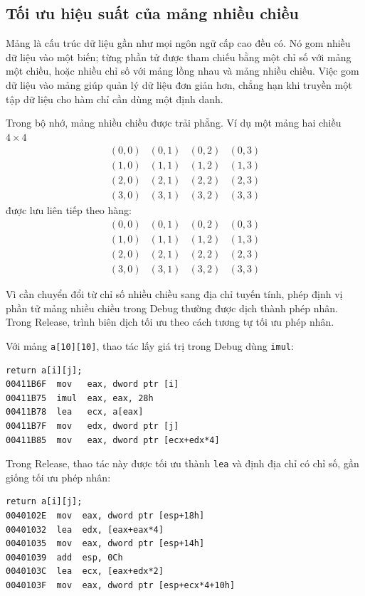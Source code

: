 \documentclass[11pt]{article}
\begin{document}
\subsection{Tối ưu hiệu suất của mảng nhiều chiều}

Mảng là cấu trúc dữ liệu gần như mọi ngôn ngữ cấp cao đều có. Nó gom nhiều dữ
liệu vào một biến; từng phần tử được tham chiếu bằng một chỉ số với mảng một
chiều, hoặc nhiều chỉ số với mảng lồng nhau và mảng nhiều chiều. Việc gom dữ
liệu vào mảng giúp quản lý dữ liệu đơn giản hơn, chẳng hạn khi truyền một tập
dữ liệu cho hàm chỉ cần dùng một định danh.

Trong bộ nhớ, mảng nhiều chiều được trải phẳng. Ví dụ một mảng hai chiều
\(4\times 4\)
\[
\begin{array}{cccc}
(0,0)&(0,1)&(0,2)&(0,3)\\
(1,0)&(1,1)&(1,2)&(1,3)\\
(2,0)&(2,1)&(2,2)&(2,3)\\
(3,0)&(3,1)&(3,2)&(3,3)
\end{array}
\]
được lưu liên tiếp theo hàng:
\[
\begin{array}{cccc}
(0,0)&(0,1)&(0,2)&(0,3)\\
(1,0)&(1,1)&(1,2)&(1,3)\\
(2,0)&(2,1)&(2,2)&(2,3)\\
(3,0)&(3,1)&(3,2)&(3,3)
\end{array}
\]

Vì cần chuyển đổi từ chỉ số nhiều chiều sang địa chỉ tuyến tính, phép định vị
phần tử mảng nhiều chiều trong Debug thường được dịch thành phép nhân. Trong
Release, trình biên dịch tối ưu theo cách tương tự tối ưu phép nhân.

Với mảng \texttt{a[10][10]}, thao tác lấy giá trị trong Debug dùng
\texttt{imul}:
\begin{verbatim}
return a[i][j];
00411B6F  mov   eax, dword ptr [i]
00411B75  imul  eax, eax, 28h
00411B78  lea   ecx, a[eax]
00411B7F  mov   edx, dword ptr [j]
00411B85  mov   eax, dword ptr [ecx+edx*4]
\end{verbatim}

Trong Release, thao tác này được tối ưu thành \texttt{lea} và định địa chỉ có
chỉ số, gần giống tối ưu phép nhân:
\begin{verbatim}
return a[i][j];
0040102E  mov  eax, dword ptr [esp+18h]
00401032  lea  edx, [eax+eax*4]
00401035  mov  eax, dword ptr [esp+14h]
00401039  add  esp, 0Ch
0040103C  lea  ecx, [eax+edx*2]
0040103F  mov  eax, dword ptr [esp+ecx*4+10h]
\end{verbatim}
\end{document}
